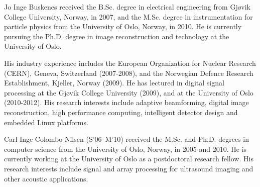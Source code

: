 \documentclass[journal]{IEEEtran}
\begin{document}
\begin{IEEEbiography}{Jo Inge Buskenes}
received the B.Sc. degree in electrical engineering from Gj\o{}vik College University, Norway, in 2007, and the M.Sc. degree in instrumentation for particle physics from the University of Oslo, Norway, in 2010. He is currently pursuing the Ph.D. degree in image reconstruction and technology at the University of Oslo.

His industry experience includes the European Organization for Nuclear Research (CERN), Geneva, Switzerland (2007-2008), and the Norwegian Defence Research Establishment, Kjeller, Norway (2009). He has lectured in digital signal processing at the Gj\o{}vik College University (2009), and at the University of Oslo (2010-2012). His research interests include adaptive beamforming, digital image reconstruction, high performance computing, intelligent detector design and embedded Linux platforms.
\end{IEEEbiography}

\begin{IEEEbiography}{Carl-Inge Colombo Nilsen}
(S’06–M’10) received the M.Sc. and Ph.D. degrees in computer science from the University of Oslo, Norway, in 2005 and 2010. He is currently working at the University of Oslo as a postdoctoral research fellow. His research interests include signal and array processing for ultrasound imaging and other acoustic applications.
\end{IEEEbiography}

\end{document}
